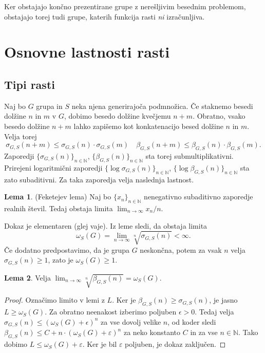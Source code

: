 \documentclass[11pt]{book}
\def\NN{\mathbb{N}}
\def\literatura{\color{modra}}
\def\vaje{{\literatura (glej vaje)}}
\theoremstyle{definition}
\theoremstyle{zgled}
\theoremstyle{odprtproblem}
\theoremstyle{domacanaloga}
\newenvironment{dokaz}
    {\color{siva}\begin{proof}}
    {\end{proof}}
\theoremstyle{izrek}
\newtheorem*{lema}{Lema}
\begin{document}
Ker obstajajo končno prezentirane grupe z nerešljivim besednim problemom, obstajajo torej tudi grupe, katerih funkcija rasti {\em ni} izračunljiva.

\section{Osnovne lastnosti rasti}

\subsection{Tipi rasti}

Naj bo $G$ grupa in $S$ neka njena generirajoča podmnožica. Če staknemo besedi dolžine $n$ in $m$ v $G$, dobimo besedo dolžine kvečjemu $n+m$. Obratno, vsako besedo dolžine $n+m$ lahko zapišemo kot konkatenacijo besed dolžine $n$ in $m$. Velja torej
\[
\sigma_{G,S}(n+m) \leq \sigma_{G,S}(n) \cdot \sigma_{G,S}(m)
\quad
\beta_{G,S}(n+m) \leq \beta_{G,S}(n) \cdot \beta_{G,S}(m).
\]
Zaporedji $\{ \sigma_{G,S}(n) \}_{n \in \NN}$, $\{ \beta_{G,S}(n) \}_{n \in \NN}$ sta torej submultiplikativni. Prirejeni logaritmični zaporedji $\{ \log \sigma_{G,S}(n) \}_{n \in \NN}$, $\{ \log \beta_{G,S}(n) \}_{n \in \NN}$ sta zato subaditivni. Za taka zaporedja velja naslednja lastnost.

\begin{lema}{\sc (Feketejev lema)}
Naj bo $\{ x_n \}_{n \in \NN}$ nenegativno subaditivno zaporedje realnih števil. Tedaj obstaja limita $\lim_{n \to \infty} x_n/n$.
\end{lema}

Dokaz je elementaren \vaje. Iz leme sledi, da obstaja limita
\[
\omega_S(G) = \lim_{n \to \infty} \sqrt[n]{\sigma_{G,S}(n)} < \infty.
\]
Če dodatno predpostavimo, da je grupa $G$ neskončna, potem za vsak $n$ velja $\sigma_{G,S}(n) \geq 1$, zato je $\omega_S(G) \geq 1$.

\begin{lema}
Velja $\lim_{n \to \infty} \sqrt[n]{\beta_{G,S}(n)} = \omega_S(G)$.
\end{lema}

\begin{dokaz}
Označimo limito v lemi z $L$. Ker je $\beta_{G,S}(n) \geq \sigma_{G,S}(n)$, je jasno $L \geq \omega_S(G)$. Za obratno neenakost izberimo poljuben $\epsilon > 0$. Tedaj velja $\sigma_{G,S}(n) \leq (\omega_S(G) + \epsilon)^n$ za vse dovolj velike $n$, od koder sledi $\beta_{G,S}(n) \leq C + n \cdot (\omega_S(G) + \varepsilon)^n$ za neko konstanto $C$ in za vse $n \in \NN$. Tako dobimo $L \leq \omega_S(G) + \varepsilon$. Ker je bil $\varepsilon$ poljuben, je dokaz zaključen.
\end{dokaz}
\end{document}
